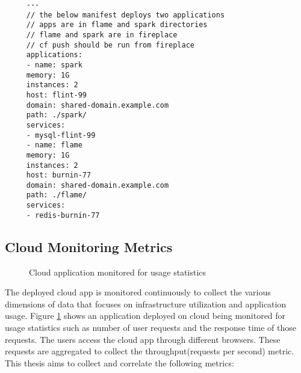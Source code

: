 \documentclass[article,type=msc,colorback,12pt,accentcolor=tud8b,table]{tudthesis}
\begin{document}
	 \begin{lstlisting}	
	 ---
	 // the below manifest deploys two applications
	 // apps are in flame and spark directories
	 // flame and spark are in fireplace
	 // cf push should be run from fireplace
	 applications:
	 - name: spark
	 memory: 1G
	 instances: 2
	 host: flint-99
	 domain: shared-domain.example.com
	 path: ./spark/
	 services:
	 - mysql-flint-99
	 - name: flame
	 memory: 1G
	 instances: 2
	 host: burnin-77
	 domain: shared-domain.example.com
	 path: ./flame/
	 services:
	 - redis-burnin-77
	 \end{lstlisting}
	
\subsection{Cloud Monitoring Metrics} 
	
 \begin{figure}[!h]
 	\begin{center}
 	\end{center}
 	\caption{Cloud application monitored for usage statistics}
 	\label{fig:cloud_app_monitored}
  \end{figure}	
	
The deployed cloud app is monitored continuously to collect the various dimensions of data that focuses on infrastructure utilization and application usage. Figure \ref{fig:cloud_app_monitored} shows an application deployed on cloud being monitored for usage statistics such as number of user requests and the response time of those requests. The users access the cloud app through different browsers. These requests are aggregated to collect the throughput(requests per second) metric. This thesis aims to collect and correlate the following metrics:
\end{document}
